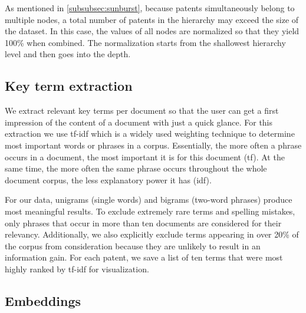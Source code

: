 As mentioned in \autoref{subsubsec:sunburst}, because patents simultaneously belong to multiple nodes, a total number of patents in the hierarchy may exceed the size of the dataset.
In this case, the values of all nodes are normalized so that they yield 100\% when combined.
The normalization starts from the shallowest hierarchy level and then goes into the depth.

\subsection{Key term extraction}
\label{subsec:term_extraction}

We extract relevant key terms per document so that the user can get a first impression of the content of a document with just a quick glance.
For this extraction we use \gls{tf-idf} which is a widely used weighting technique to determine most important words or phrases in a corpus.
Essentially, the more often a phrase occurs in a document, the most important it is for this document (\gls{tf}).
At the same time, the more often the same phrase occurs throughout the whole document corpus, the less explanatory power it has (\gls{idf}).

For our data, unigrams (single words) and bigrams (two-word phrases) produce most meaningful results.
To exclude extremely rare terms and spelling mistakes, only phrases that occur in more than ten documents are considered for their relevancy.
Additionally, we also explicitly exclude terms appearing in over 20\% of the corpus from consideration because they are unlikely to result in an information gain.
For each patent, we save a list of ten terms that were most highly ranked by \gls{tf-idf} for visualization.

\subsection{Embeddings}
\label{subsec:embeddings}

